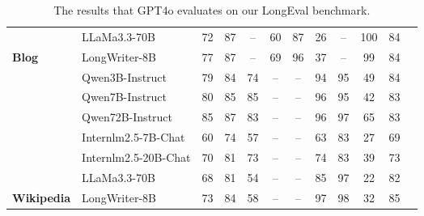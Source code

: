 \begin{table*}[hbt!]
\begin{center}
{\begin{tabular}{l|l|l|ccccccccc}
 \\
 

& LLaMa3.3-70B & 72	&	87 &	--&	60	&	87 &		26 		&	--	&	100	&84	

 
 \\
\multirow{-7}{*}{\textbf{Blog}}& LongWriter-8B	& 77	& 87 &		--	&	69	&	96 	&	37 	&--	&	99 	&	84


\\

\midrule[1pt]

&Qwen3B-Instruct	& 79 &		84 	 &74	 &	--		 &--	 &	94 		 &	95 & 	49	  &84	

 \\
&Qwen7B-Instruct	&  80 	 &		85  &	85 &	--	 &	--	 &	96 		 &	95 		 &42 &	83

 \\
&Qwen72B-Instruct	&85		 &87 	 &	83	 & 	--	 &	--	 &	96 	 &	97 &65	  &83	

\\
&Internlm2.5-7B-Chat&		60 	 &	74  &57	 &	--	 &	--		 &63 &		83  &		27  &		69 

  \\
&Internlm2.5-20B-Chat	&70	 &81 	 &	73 	 &		--		 &--	 &	74  &	83	 &	39 	  & 73	

  \\
 
&LLaMa3.3-70B& 68	 &	81 		 &	54 		 &--	 &	--		 &85  &		97	 &22	 &82

\\

\multirow{-7}{*}{\textbf{Wikipedia}}&	 LongWriter-8B	&73	 &84 &	58  &			--	 &	--		 &97 &		98 	  &	32	 &85	
\\


\midrule[1pt]
\end{tabular}
}
\end{center}
\caption{
The results that GPT4o evaluates on our LongEval benchmark.
}
\label{tab:GPT4o Result}
\end{table*}